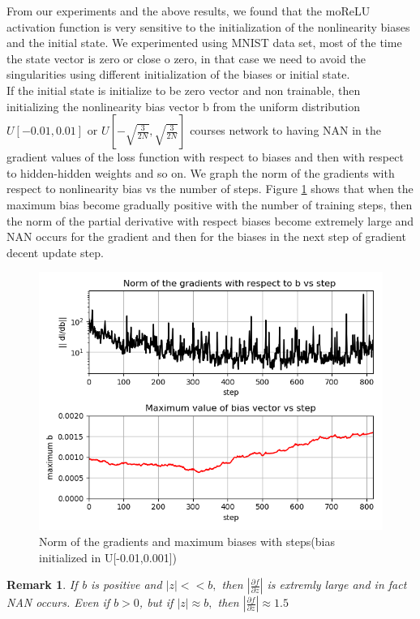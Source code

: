 \documentclass[letterpaper]{article} %
\newtheorem*{remark}{Remark}
\begin{document}
\noindent From our experiments and the above results, we found that the moReLU activation function is very sensitive to the initialization of the nonlinearity biases and the initial state. We experimented using MNIST data set, most of the time the state vector is zero or close o zero, in that case we need to avoid the singularities using different initialization of the biases or initial state.\\

\noindent If the initial state is initialize to be zero vector and non trainable, then initializing the nonlinearity bias vector b from the uniform distribution $U[-0.01,0.01]$ or $U[-\sqrt{\frac{3}{2N}},\sqrt{\frac{3}{2N}}]$ courses network to  having NAN in the gradient values of the loss function with respect to biases and then with respect to hidden-hidden weights and so on. We graph the norm of the gradients with respect to nonlinearity bias vs the number of steps. Figure \ref{fig_modrelu1} shows that when the maximum bias become gradually positive with the number of training steps, then the norm of the partial derivative with respect biases become extremely large and NAN occurs for the gradient and then for the biases in the next step of gradient decent update step.\\

\begin{figure}
\centering
\includegraphics[width=0.8\linewidth]{ModRelu1.png}
  \caption{Norm of the gradients and maximum biases with steps(bias initialized in U[-0.01,0.001])}
  \label{fig_modrelu1}
\end{figure}

\begin{remark}
If b is positive and $|z| << b,$ then $|\frac{\partial f}{\partial z}|$ is extremly large and in fact NAN occurs. Even if $b>0$, but if $|z| \approx b,$ then $|\frac{\partial f}{\partial z}| \approx 1.5$
\end{remark}
\end{document}
